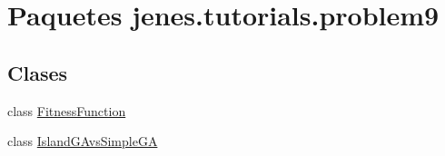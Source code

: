 \hypertarget{namespacejenes_1_1tutorials_1_1problem9}{\section{Paquetes jenes.\-tutorials.\-problem9}
\label{namespacejenes_1_1tutorials_1_1problem9}
}
\subsection*{Clases}
\begin{DoxyCompactItemize}
\item 
class \hyperlink{classjenes_1_1tutorials_1_1problem9_1_1_fitness_function}{Fitness\-Function}
\item 
class \hyperlink{classjenes_1_1tutorials_1_1problem9_1_1_island_g_avs_simple_g_a}{Island\-G\-Avs\-Simple\-G\-A}
\end{DoxyCompactItemize}
